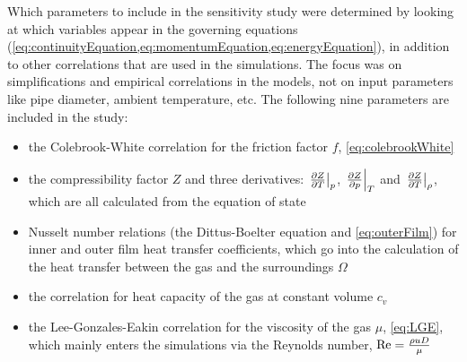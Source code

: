 Which parameters to include in the sensitivity study were determined by looking at which variables appear in the governing equations (\cref{eq:continuityEquation,eq:momentumEquation,eq:energyEquation}), in addition to other correlations that are used in the simulations. The focus was on simplifications and empirical correlations in the models, not on input parameters like pipe diameter, ambient temperature, etc. %
The following nine parameters are included in the study:
\begin{itemize}
    \item the Colebrook-White correlation for the friction factor $f$, \cref{eq:colebrookWhite}
    
    \item the compressibility factor $Z$ and three derivatives: $\eval{\pd{Z}{T}}_p$, $\eval{\pd{Z}{p}}_T$ and $\eval{\pd{Z}{T}}_\rho$, which are all calculated from the equation of state
    
    \item Nusselt number relations (the Dittus-Boelter equation and \cref{eq:outerFilm}) for inner and outer film heat transfer coefficients, which go into the calculation of the heat transfer between the gas and the surroundings $\Omega$
    
    \item the correlation for heat capacity of the gas at constant volume %
    $c_v$
    
    \item the Lee-Gonzales-Eakin correlation for the viscosity of the gas $\mu$, \cref{eq:LGE}, which mainly enters the simulations via the Reynolds number, $\operatorname{R\kern-.04em e} = \frac{\rho u D}{\mu}$
 \end{itemize}



